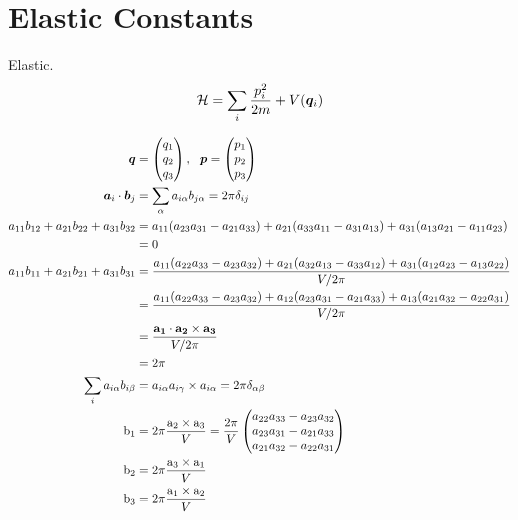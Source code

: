 \documentclass[11pt,a4paper,uplatex]{jsarticle}
\begin{document}
\section{Elastic Constants}
Elastic\cite{Lutsko1989}. 
\begin{align}
    {\cal H} = \sum_{i} \frac{p_{i}^{2}}{2m} + V({\bm{q}_{i}})
\end{align}    

\begin{align}
\bm{q} &= \begin{pmatrix} q_{1} \\ q_{2} \\ q_{3} \end{pmatrix}, \ \ 
\bm{p} = \begin{pmatrix} p_{1} \\ p_{2} \\ p_{3} \end{pmatrix} \\ 
\bm{a}_{i} \cdot \bm{b}_{j}&= \sum_{\alpha} a_{i \alpha} b_{j \alpha} = 2 \pi \delta_{ij} \\
a_{11} b_{12} + a_{21}  b_{22} + a_{31} b_{32} &=
a_{11} (a_{23}a_{31}-a_{21}a_{33}) + a_{21} (a_{33}a_{11}-a_{31}a_{13}) + a_{31}(a_{13}a_{21}-a_{11}a_{23})\\ 
&= 0\\
a_{11} b_{11} + a_{21}  b_{21} + a_{31} b_{31} &=
\frac{a_{11} (a_{22}a_{33}-a_{23}a_{32}) + a_{21} (a_{32}a_{13}-a_{33}a_{12}) + a_{31}(a_{12}a_{23}-a_{13}a_{22})}{V/2\pi}\\ 
&= \frac{a_{11} (a_{22}a_{33}-a_{23}a_{32}) + a_{12} (a_{23}a_{31} -a_{21} a_{33}) + a_{13}(a_{21} a_{32} - a_{22}a_{31})}{V/2\pi}\\
&= \frac{\bf{a}_{1} \cdot \bf{a}_{2} \times \bf{a}_{3}}{V/2\pi}\\
&= 2\pi\\
\sum_{i} a_{i \alpha} b_{i \beta} &= a_{i \alpha} a_{i \gamma}\times a_{i \alpha} =2\pi \delta_{\alpha \beta} \\
\rm{b}_{1} &= 2\pi \frac{ \rm{a}_{2} \times \rm{a}_{3}}{V} 
        = \frac{2\pi}{V} \begin{pmatrix} a_{22}a_{33} - a_{23}a_{32} \\ a_{23}a_{31} - a_{21}a_{33} \\ a_{21}a_{32} - a_{22}a_{31} \end{pmatrix} \\
\rm{b}_{2} &= 2\pi \frac{ \rm{a}_{3} \times \rm{a}_{1}}{V} \\
\rm{b}_{3} &= 2\pi \frac{ \rm{a}_{1} \times \rm{a}_{2}}{V} 
\end{align}
\end{document}
